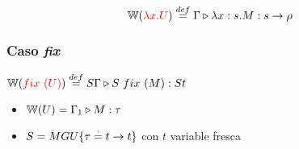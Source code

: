\documentclass[10pt,a4paper]{article}
\begin{document}
$$\mathbb{W}({\color{red}\lambda x. U}) \overset{def}{=} \Gamma\triangleright \lambda x: s . M : s\to\rho$$

\subsubsection*{Caso \textit{fix}}
$\mathbb{W}({\color{red}fix~(U)}) \overset{def}{=} S\Gamma\triangleright S~fix~(M) : St$
\begin{centrado}
\begin{itemize}
\item $\mathbb{W}(U) = \Gamma_1\triangleright M : \tau$
\item $S = MGU\{\tau\overset{\cdot}{=} t\to t\}$ con $t$ variable fresca
\end{itemize}
\end{centrado}
\end{document}
